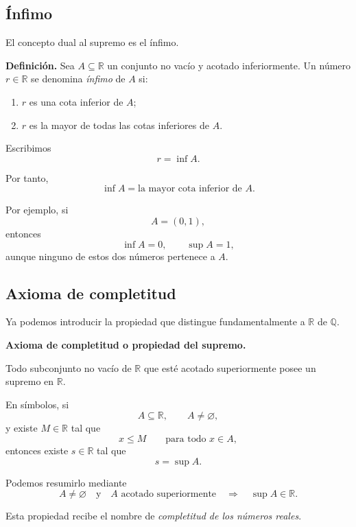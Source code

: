 \documentclass[12pt]{article}
\begin{document}
{%
\subsection{Ínfimo}

El concepto dual al supremo es el ínfimo.

\textbf{Definición.}
Sea $A\subseteq\mathbb{R}$ un conjunto no vacío y acotado inferiormente.
Un número $r\in\mathbb{R}$ se denomina \emph{ínfimo} de $A$ si:

\begin{enumerate}
    \item $r$ es una cota inferior de $A$;

    \item $r$ es la mayor de todas las cotas inferiores de $A$.
\end{enumerate}

Escribimos
\[
r=\inf A.
\]

Por tanto,
\[
\boxed{
\inf A=\text{la mayor cota inferior de }A.
}
\]

Por ejemplo, si
\[
A=(0,1),
\]
entonces
\[
\inf A=0,
\qquad
\sup A=1,
\]
aunque ninguno de estos dos números pertenece a $A$.

\subsection{Axioma de completitud}

Ya podemos introducir la propiedad que distingue fundamentalmente a
$\mathbb{R}$ de $\mathbb{Q}$.

\textbf{Axioma de completitud o propiedad del supremo.}

Todo subconjunto no vacío de $\mathbb{R}$ que esté acotado superiormente
posee un supremo en $\mathbb{R}$.

En símbolos, si
\[
A\subseteq\mathbb{R},
\qquad
A\neq\varnothing,
\]
y existe $M\in\mathbb{R}$ tal que
\[
x\leq M
\qquad\text{para todo }x\in A,
\]
entonces existe $s\in\mathbb{R}$ tal que
\[
s=\sup A.
\]

Podemos resumirlo mediante
\[
\boxed{
A\neq\varnothing
\quad\text{y}\quad
A\text{ acotado superiormente}
\quad\Longrightarrow\quad
\sup A\in\mathbb{R}.
}
\]

Esta propiedad recibe el nombre de \emph{completitud de los números reales}.

}
\end{document}
